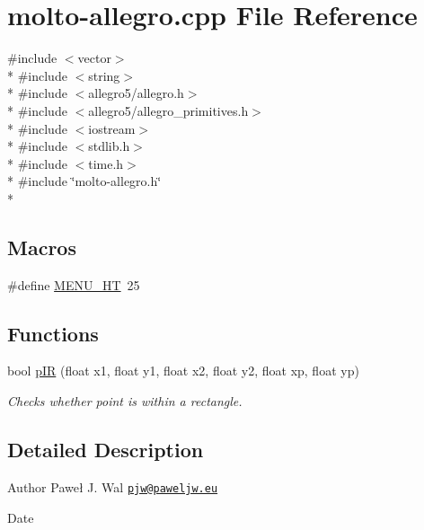 \hypertarget{molto-allegro_8cpp}{\section{molto-\/allegro.cpp File Reference}
\label{molto-allegro_8cpp}
}
{\ttfamily \#include $<$vector$>$}\\*
{\ttfamily \#include $<$string$>$}\\*
{\ttfamily \#include $<$allegro5/allegro.\-h$>$}\\*
{\ttfamily \#include $<$allegro5/allegro\-\_\-primitives.\-h$>$}\\*
{\ttfamily \#include $<$iostream$>$}\\*
{\ttfamily \#include $<$stdlib.\-h$>$}\\*
{\ttfamily \#include $<$time.\-h$>$}\\*
{\ttfamily \#include \char`\"{}molto-\/allegro.\-h\char`\"{}}\\*
\subsection*{Macros}
\begin{DoxyCompactItemize}
\item 
\#define \hyperlink{molto-allegro_8cpp_a6074a5564c1d0d5ce23e8f15d64375e7}{M\-E\-N\-U\-\_\-\-H\-T}~25
\end{DoxyCompactItemize}
\subsection*{Functions}
\begin{DoxyCompactItemize}
\item 
\hypertarget{molto-allegro_8cpp_ac6a0dfdd5acbe8c5b1ee9fcb3fc39755}{bool \hyperlink{molto-allegro_8cpp_ac6a0dfdd5acbe8c5b1ee9fcb3fc39755}{p\-I\-R} (float x1, float y1, float x2, float y2, float xp, float yp)}\label{molto-allegro_8cpp_ac6a0dfdd5acbe8c5b1ee9fcb3fc39755}

\begin{DoxyCompactList}\small\item\em Checks whether point is within a rectangle. \end{DoxyCompactList}\end{DoxyCompactItemize}


\subsection{Detailed Description}
\begin{DoxyAuthor}{Author}
Paweł J. Wal \href{mailto:pjw@paweljw.eu}{\tt pjw@paweljw.\-eu} 
\end{DoxyAuthor}
\begin{DoxyDate}{Date}

\end{DoxyDate}


